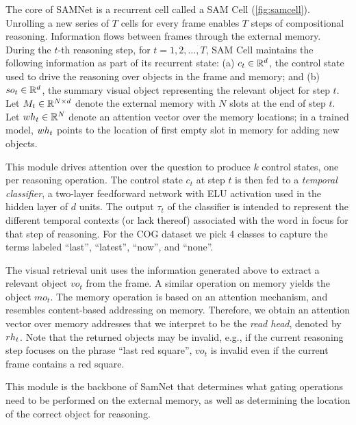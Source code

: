 The core of SAMNet is a recurrent cell called a SAM Cell (\cref{fig:samcell}). 
Unrolling a new series of $T$ cells for every frame enables $T$ steps of compositional
reasoning.
Information flows between frames through the external memory. 
During the $t$-th reasoning step, for $t=1,2, \dots, T$, SAM Cell maintains the following information as part of its recurrent state:
(a) $c_t \in \mathbb{R}^d$, the control state used to drive the reasoning over objects in the frame and memory; and
(b) $so_t  \in \mathbb{R}^d$, the summary visual object representing the relevant object for step $t$.
Let $M_t \in  \mathbb{R}^{N \times d}$ denote the external memory with $N$ slots at the end of step $t$.
Let $wh_t \in  \mathbb{R}^N$ denote an attention vector over the memory locations;
in a trained model, $wh_t$ points to the location of first empty slot in memory for adding new objects.   

This module drives attention over the question to produce $k$ control states, one per reasoning operation. 
The control state $c_t$ at step $t$ is then fed to a \emph{temporal classifier}, 
a two-layer feedforward network with ELU activation used in the hidden layer of $d$ units.
The output $\tau_t$ of the classifier is intended to represent the different temporal contexts (or lack thereof) associated with the word in focus for that step of reasoning.	
For the COG dataset we pick 4 classes to capture the terms labeled ``last'', ``latest'', ``now'', and ``none''.

The visual retrieval unit uses the information generated above to extract a relevant object $vo_t$ from the frame.
A similar operation on memory yields the object $mo_t$. The memory operation is based on an attention mechanism,
and resembles content-based addressing on memory. Therefore, we obtain an attention vector over memory addresses
that we interpret to be the \emph{read head}, denoted by $rh_t$.
Note that the returned objects may be invalid, 
e.g., if the current reasoning step focuses on the phrase ``last red square'', $vo_t$ is invalid 
even if the current frame contains a red square. 

This module is the backbone of SamNet that determines what gating operations need to be performed on the external memory, as well as
determining the location of the correct object for reasoning.

